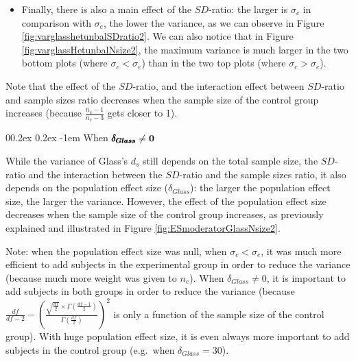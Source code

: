 \documentclass[
  english,
  man]{apa6}
\makeatletter
\providecommand{\tightlist}{%
  \setlength{\itemsep}{0pt}\setlength{\parskip}{0pt}}
\let\oldparagraph\paragraph
\renewcommand{\paragraph}[1]{\oldparagraph{#1}\mbox{}}
\renewcommand{\paragraph}{\@startsection{paragraph}{4}{\parindent}%
  {0\baselineskip \@plus 0.2ex \@minus 0.2ex}%
  {-1em}%
  {\normalfont\normalsize\bfseries\itshape\typesectitle}}
\makeatother
\begin{document}
\begin{itemize}
\tightlist
\item
  Finally, there is also a main effect of the \(SD\)-ratio: the larger is \(\sigma_c\) in comparison with \(\sigma_e\), the lower the variance, as we can observe in Figure \ref{fig:varglasshetunbalSDratio2}. We can also notice that in Figure \ref{fig:varglassHetunbalNsize2}, the maximum variance is much larger in the two bottom plots (where \(\sigma_c<\sigma_e\)) than in the two top plots (where \(\sigma_c>\sigma_e\)).
\end{itemize}

Note that the effect of the \(SD\)-ratio, and the interaction effect between \(SD\)-ratio and sample sizes ratio decreases when the sample size of the control group increases (because \(\frac{n_c-1}{n_c-3}\) gets closer to 1).

\hypertarget{when-bf-pmbdelta_glass-neq-0-2}{%
\paragraph{\texorpdfstring{When \(\bf \pmb{\delta_{Glass}} \neq 0\)}{When \textbackslash bf \textbackslash pmb\{\textbackslash delta\_\{Glass\}\} \textbackslash neq 0}}\label{when-bf-pmbdelta_glass-neq-0-2}}

While the variance of Glass's \(d_s\) still depends on the total sample size, the \(SD\)-ratio and the interaction between the \(SD\)-ratio and the sample sizes ratio, it also depends on the population effect size (\(\delta_{Glass}\)): the larger the population effect size, the larger the variance. However, the effect of the population effect size decreases when the sample size of the control group increases, as previously explained and illustrated in Figure \ref{fig:ESmoderatorGlassNsize2}.

Note: when the population effect size was null, when \(\sigma_c<\sigma_e\), it was much more efficient to add subjects in the experimental group in order to reduce the variance (because much more weight was given to \(n_e\)). When \(\delta_{Glass} \neq 0\), it is important to add subjects in both groups in order to reduce the variance (because \(\frac{df}{df-2} - \left( \frac{\sqrt{\frac{df}{2}} \times \Gamma \left(\frac{df-1}{2} \right)}{\Gamma \left( \frac{df}{2}\right)}\right)^2\) is only a function of the sample size of the control group). With huge population effect size, it is even always more important to add subjects in the control group (e.g.~when \(\delta_{Glass}=30\)).
\end{document}
